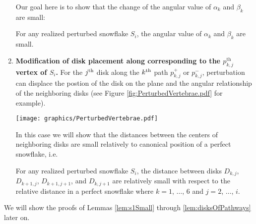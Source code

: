 \begin{enumerate}
Our goal here is to show that the change of the angular value of $\alpha_k$ and $\beta_k$ are small:
\begin{lem}\label{lem:angularArrangement}
For any realized perturbed snowflake $S_i$, the angular value of $\alpha_k$ and $\beta_k$ are small.
\end{lem}

\item \textbf{Modification of disk placement along corresponding to the $p_{k,j}^\text{th}$ vertex of $S_i$.}  
For the $j^\text{th}$ disk along the $k^\text{th}$ path $p_{k,j}^+$ or $p_{k,j}^-$, perturbation can displace the postion of the disk on the plane and the angular relationship of the neighboring disks (see Figure \ref{fig:PerturbedVertebrae.pdf} for example). 

\begin{minipage}{\linewidth}
\begin{center}
\texttt{[image: graphics/PerturbedVertebrae.pdf]}
\label{fig:PerturbedVertebrae.pdf}
\end{center}
\end{minipage}

In this case we will show that the distances between the centers of neighboring disks are small relatively to canonical position of a perfect snowflake, i.e.
\begin{lem}\label{lem:disksOfPathways}
For any realized perturbed snowflake $S_i$, the distance between disks $D_{k,j}$, $D_{k+1,j}$, $D_{k+1,j+1}$, and $D_{k,j+1}$ are relatively small with respect to the relative distance in a perfect snowflake where $k = 1$, $\dots$, $6$ and $j = 2$, $\dots$, $i$.
\end{lem}
\end{enumerate} 

We will show the proofs of Lemmas \ref{lem:s1Small} through \ref{lem:disksOfPathways} later on.



